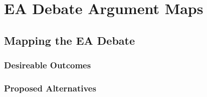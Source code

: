 \chapter{EA Debate Argument Maps}
\label{chap-arguments}


\section{Mapping the EA Debate}

\subsection{Desireable Outcomes}


\subsection{Proposed Alternatives}


















